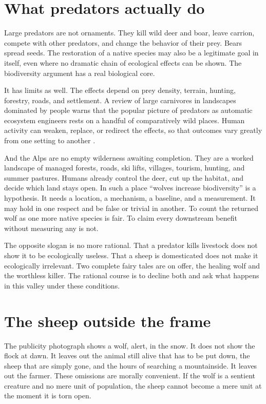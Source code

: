 \documentclass[12pt,a4paper]{book}
\begin{document}
\section{What predators actually do}

Large predators are not ornaments. They kill wild deer and boar, leave carrion, compete with other predators, and change the behavior of their prey. Bears spread seeds. The restoration of a native species may also be a legitimate goal in itself, even where no dramatic chain of ecological effects can be shown. The biodiversity argument has a real biological core.

It has limits as well. The effects depend on prey density, terrain, hunting, forestry, roads, and settlement. A review of large carnivores in landscapes dominated by people warns that the popular picture of predators as automatic ecosystem engineers rests on a handful of comparatively wild places. Human activity can weaken, replace, or redirect the effects, so that outcomes vary greatly from one setting to another \cite{KuijperCarnivores2016}.

And the Alps are no empty wilderness awaiting completion. They are a worked landscape of managed forests, roads, ski lifts, villages, tourism, hunting, and summer pastures. Humans already control the deer, cut up the habitat, and decide which land stays open. In such a place ``wolves increase biodiversity'' is a hypothesis. It needs a location, a mechanism, a baseline, and a measurement. It may hold in one respect and be false or trivial in another. To count the returned wolf as one more native species is fair. To claim every downstream benefit without measuring any is not.

The opposite slogan is no more rational. That a predator kills livestock does not show it to be ecologically useless. That a sheep is domesticated does not make it ecologically irrelevant. Two complete fairy tales are on offer, the healing wolf and the worthless killer. The rational course is to decline both and ask what happens in this valley under these conditions.

\section{The sheep outside the frame}

The publicity photograph shows a wolf, alert, in the snow. It does not show the flock at dawn. It leaves out the animal still alive that has to be put down, the sheep that are simply gone, and the hours of searching a mountainside. It leaves out the farmer. These omissions are morally convenient. If the wolf is a sentient creature and no mere unit of population, the sheep cannot become a mere unit at the moment it is torn open.
\end{document}
